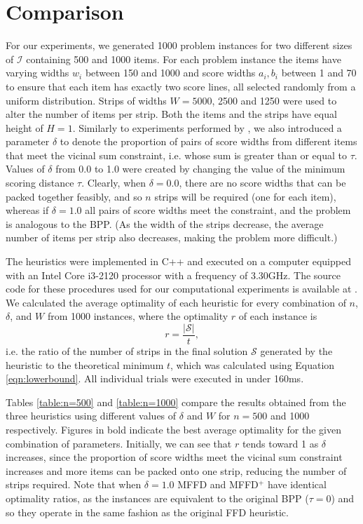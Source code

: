 \documentclass[oribibl]{llncs}
\begin{document}
\section{Comparison}
For our experiments, we generated 1000 problem instances for two different sizes of $\mathcal{I}$ containing 500 and 1000 items. For each problem instance the items have varying widths $w_i$ between 150 and 1000 and score widths $a_i, b_i$ between 1 and 70 to ensure that each item has exactly two score lines, all selected randomly from a uniform distribution. Strips of widths $W = 5000$, 2500 and 1250 were used to alter the number of items per strip. Both the items and the strips have equal height of $H = 1$. Similarly to experiments performed by \cite{lewis2011}, we also introduced a parameter $\delta$ to denote the proportion of pairs of score widths from different items that meet the vicinal sum constraint, i.e. whose sum is greater than or equal to $\tau$. Values of $\delta$ from 0.0 to 1.0 were created by changing the value of the minimum scoring distance $\tau$. Clearly, when $\delta = 0.0$, there are no score widths that can be packed together feasibly, and so $n$ strips will be required (one for each item), whereas if $\delta = 1.0$ all pairs of score widths meet the constraint, and the problem is analogous to the BPP. (As the width of the strips decrease, the average number of items per strip also decreases, making the problem more difficult.)

The heuristics were implemented in C++ and executed on a computer equipped with an Intel Core i3-2120 processor with a frequency of 3.30GHz. The source code for these procedures used for our computational experiments is available at \cite{hawa2018}. We calculated the average optimality of each heuristic for every combination of $n$, $\delta$, and $W$ from 1000 instances, where the optimality $r$ of each instance is
\begin{equation}
	r = \frac{|\mathcal{S}|}{t},
\end{equation}
i.e. the ratio of the number of strips in the final solution $\mathcal{S}$ generated by the heuristic to the theoretical minimum $t$, which was calculated using Equation \ref{eqn:lowerbound}. All individual trials were executed in under 160ms.

Tables \ref{table:n=500} and \ref{table:n=1000} compare the results obtained from the three heuristics using different values of $\delta$ and $W$ for $n = 500$ and 1000 respectively. Figures in bold indicate the best average optimality for the given combination of parameters. Initially, we can see that $r$ tends toward 1 as $\delta$ increases, since the proportion of score widths meet the vicinal sum constraint increases and more items can be packed onto one strip, reducing the number of strips required. Note that when $\delta = 1.0$ MFFD and MFFD$^+$ have identical optimality ratios, as the instances are equivalent to the original BPP ($\tau = 0$) and so they operate in the same fashion as the original FFD heuristic.
\end{document}
